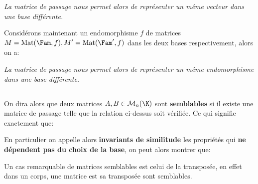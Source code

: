 \begin{center}
   \textit{La matrice de passage nous permet alors de représenter un même vecteur\+ 
   dans une base différente.}
\end{center}
Considérons maintenant un endomorphisme \(f\) de matrices \(M = \text{Mat}(\Fam, f), M' = \text{Mat}(\Fam', f)\) dans les deux bases respectivement, alors on a:
\begin{center}
   \textit{La matrice de passage nous permet alors de représenter un même endomorphisme\+ 
   dans une base différente.}
\end{center}
\pagebreak

\subsection*{}

On dira alors que deux matrices \(A, B \in \mathcal{M}_n(\K)\) sont \textbf{semblables} si il existe une matrice de passage telle que la relation ci-dessus soit vérifiée.
Ce qui signifie exactement que:

En particulier on appelle alors \textbf{invariants de similitude} les propriétés qui \textbf{ne dépendent pas du choix de la base}, on peut alors montrer que:
   
Un cas remarquable de matrices semblables est celui de la transposée, en effet dans un corps, une matrice est sa transposée sont semblables.

\subsection*{}

